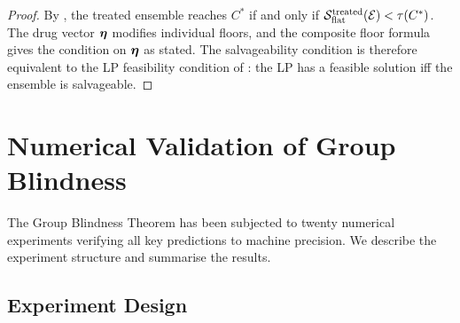 \begin{proof}
By , the treated ensemble reaches $C^*$ if and
only if $\mathcal{S}_{\mathrm{flat}}^{\mathrm{treated}}(\mathcal{E}) < \tau(C^*)$.  The
drug vector $\boldsymbol{\eta}$ modifies individual floors, and the composite floor
formula gives the condition on $\boldsymbol{\eta}$ as stated.  The salvageability
condition is therefore equivalent to the LP feasibility condition of
: the LP has a feasible solution iff the ensemble
is salvageable.
\end{proof}

\section{Numerical Validation of Group Blindness}
\label{sec:numerical-validation}

The Group Blindness Theorem has been subjected to twenty numerical experiments
verifying all key predictions to machine precision.  We describe the experiment
structure and summarise the results.

\subsection{Experiment Design}

